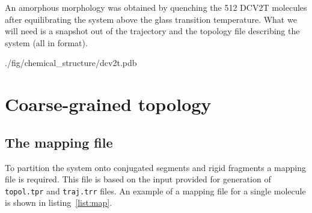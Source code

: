 An amorphous morphology was obtained by quenching the 512 DCV2T molecules after equilibrating the system above the glass transition temperature. What we will need is a snapshot out of the trajectory and the topology file describing the system (all in \gromacs format).

%
{./fig/chemical_structure/dcv2t.pdb}

\section{Coarse-grained topology}
\label{sec:coarsegrained}


\subsection{The mapping file}
To partition the system onto conjugated segments and rigid fragments a mapping \xml file is required. This file is based on the input provided for generation of \texttt{topol.tpr} and \texttt{traj.trr} files. An example of a mapping file for a single \dcvt molecule is shown in listing~\ref{list:map}. 

